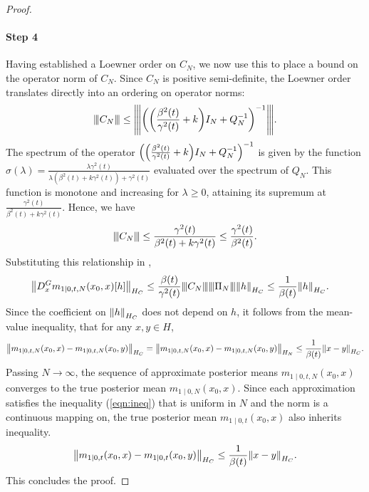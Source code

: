 \begin{proof}
  \paragraph{Step 4} Having established a Loewner order on \(C_{N}\), we now use this to place a bound on the operator norm of \(C_{N}\). Since \(C_{N}\) is positive semi-definite, the Loewner order translates directly into an ordering on operator norms:
  \[
    {\left\vert\kern-0.25ex\left\vert\kern-0.25ex\left\vert C_{N} \right\vert\kern-0.25ex\right\vert\kern-0.25ex\right\vert} \leq {\left\vert\kern-0.25ex\left\vert\kern-0.25ex\left\vert \qty(\qty(\frac{\beta^{2}(t)}{\gamma^{2}(t)} + k) I_{N} + Q_{N}^{-1})^{-1} \right\vert\kern-0.25ex\right\vert\kern-0.25ex\right\vert}.
  \] %
  The spectrum of the operator \(\qty(\qty(\frac{\beta^{2}(t)}{\gamma^{2}(t)} + k) I_{N} + Q_{N}^{-1})^{-1}\) is given by the function \(\sigma(\lambda) = \frac{\lambda \gamma^{2}(t)}{\lambda (\beta^{2}(t) + k \gamma^{2}(t)) + \gamma^{2}(t)}\) evaluated over the spectrum of \(Q_{N}\). This function is monotone and increasing for \(\lambda \geq 0\), attaining its supremum at \(\frac{\gamma^{2}(t)}{\beta^{2}(t) + k \gamma^{2}(t)}\). Hence, we have
  \[
    {\left\vert\kern-0.25ex\left\vert\kern-0.25ex\left\vert C_{N} \right\vert\kern-0.25ex\right\vert\kern-0.25ex\right\vert} \leq \frac{\gamma^{2}(t)}{\beta^{2}(t) + k \gamma^{2}(t)} \leq \frac{\gamma^{2}(t)}{\beta^{2}(t)}.
  \] Substituting this relationship in ,
  \begin{align*}
    \norm{D_{x}^{G} m_{1 \mid 0, t, N}(x_{0}, x)[h]}_{H_{C}} &\leq \frac{\beta(t)}{\gamma^{2}(t)} {\left\vert\kern-0.25ex\left\vert\kern-0.25ex\left\vert C_{N} \right\vert\kern-0.25ex\right\vert\kern-0.25ex\right\vert} {\left\vert\kern-0.25ex\left\vert\kern-0.25ex\left\vert \Pi_{N} \right\vert\kern-0.25ex\right\vert\kern-0.25ex\right\vert} \norm{h}_{H_{C}} \leq \frac{1}{\beta(t)} \norm{h}_{H_{C}}.
  \end{align*}
  Since the coefficient on \(\norm{h}_{H_{C}}\) does not depend on \(h\), it follows from the mean-value inequality, that for any \(x, y \in H\),
  \begin{equation}
    \norm{m_{1 \mid 0, t, N}(x_{0}, x) - m_{1 \mid 0, t, N}(x_{0}, y)}_{H_{C}} = \norm{m_{1 \mid 0, t, N}(x_{0}, x) - m_{1 \mid 0, t, N}(x_{0}, y)}_{H_{N}} \leq \frac{1}{\beta(t)} \norm{x - y}_{H_{C}}. \label{eqn:ineq}
  \end{equation}%
  Passing \(N \to \infty\), the sequence of approximate posterior means \(m_{1 \mid 0, t, N}(x_{0}, x)\) converges to the true posterior mean \(m_{1 \mid 0, N}(x_{0}, x)\). Since each approximation satisfies the inequality (\ref{eqn:ineq}) that is uniform in \(N\) and the norm is a continuous mapping on, the true posterior mean \(m_{1 \mid 0, t}(x_{0}, x)\) also inherits inequality.
  \[
    \norm{m_{1 \mid 0, t}(x_{0}, x) - m_{1 \mid 0, t}(x_{0}, y)}_{H_{C}} \leq \frac{1}{\beta(t)} \norm{x - y}_{H_{C}}.
  \]
  This concludes the proof.%
\end{proof}

